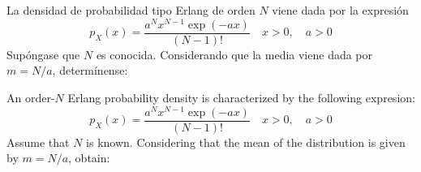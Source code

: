 \ifspanish

\question La densidad de probabilidad tipo Erlang de orden $N$ viene dada por la expresión
  $$p_X(x)=\frac{a^N x^{N-1} \exp (-ax)}{(N-1)!} \quad  x >0, \quad   a>0 $$
Supóngase que $N$ es conocida. Considerando que la media viene dada por $m = N/a$, determínense: 

\begin{solution}
\end{solution}

\else

\question An order-$N$ Erlang probability density is characterized by the following expresion:
  $$p_X(x)=\frac{a^N x^{N-1} \exp (-ax)}{(N-1)!} \quad  x >0, \quad   a>0 $$
Assume that $N$ is known.  Considering that the mean of the distribution is given by $m = N/a$, obtain: 

